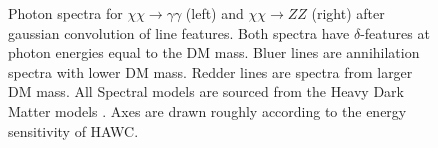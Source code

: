 \begin{figure}[t]
    \caption{Photon spectra for $\chi\chi \rightarrow \gamma\gamma$ (left) and $\chi\chi \rightarrow ZZ$ (right) after gaussian convolution of line features. Both spectra have $\delta$-features at photon energies equal to the DM mass. Bluer lines are annihilation spectra with lower DM mass. Redder lines are spectra from larger DM mass. All Spectral models are sourced from the Heavy Dark Matter models \cite{HDMSpectra}. Axes are drawn roughly according to the energy sensitivity of HAWC.}
    \label{fig:hdm_gamma_lines}
\end{figure}


